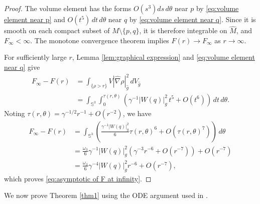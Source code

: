 \documentclass[11pt]{amsart}
\theoremstyle{plain}
\numberwithin{equation}{section}
\renewcommand{\S}{\mathbb{S}}
\newcommand{\hn}{\widehat{\nabla}}
\newcommand{\hg}{\widehat{g}}
\newcommand{\hm}{\widehat{M}}
\newcommand{\dv}{\,dV_{\widehat{g}}}
\begin{document}
\begin{proof}
The volume element has the forms $O(s^3)ds\,d\theta$ near $p$ by \eqref{eq:volume element near p} and $O(t^5)\,dt\,d\theta$ near $q$ by \eqref{eq:volume element near q}. Since it is smooth on each compact subset of $M\setminus\{p,q\}$, it is therefore integrable on $\hm$, and $F_\infty<\infty$. The monotone convergence theorem implies $F(r)\rightarrow F_\infty$ as $r\rightarrow\infty$.

For sufficiently large $r$, Lemma \ref{lem:graphical expression} and \eqref{eq:volume element near q} give
\begin{align*}
F_\infty-F(r)&=\int_{\{\rho>r\}}V|\hn\rho|_{\hg}^2\dv\\
&=\int_{\S^3}\int_0^{\tau(r,\theta)}\left(\gamma^{-1}|W(q)|^2_g\,t^5+O(t^6)\right)\,dt\,d\theta.
\end{align*}
Noting $\tau(r,\theta)=\gamma^{-1/2}r^{-1}+O(r^{-2})$, we have
\begin{align*}
F_\infty-F(r)&=\int_{\S^3}\left(\frac{\gamma^{-1}|W(q)|_g^2}{6}\tau(r,\theta)^6+O(\tau(r,\theta)^7)\right)\,d\theta\\
&=\frac{\omega_3}{6}\gamma^{-1}|W(q)|^2_g\left(\gamma^{-3}r^{-6}+O(r^{-7})\right)+O(r^{-7})\\
&=\frac{\omega_3}{6}\gamma^{-4}|W(q)|^2_g r^{-6}+O(r^{-7}),
\end{align*}
which proves \eqref{eq:asymptotic of F at infinity}.
\end{proof}

We now prove Theorem \ref{thm1} using the ODE argument used in \cite{LP25}.
\end{document}

